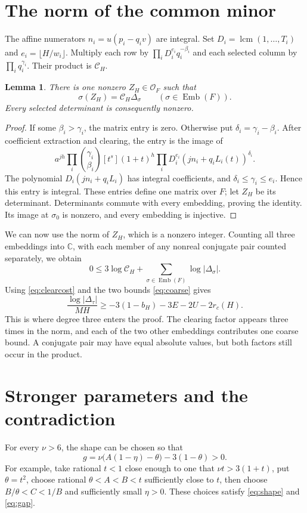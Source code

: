 \documentclass[11pt]{article}
\newcommand{\C}{\mathbb C}
\newcommand{\OO}{\mathcal O}
\newcommand{\Emb}{\operatorname{Emb}}
\newtheorem{lemma}[theorem]{Lemma}
\theoremstyle{remark}
\begin{document}
\section{The norm of the common minor}\label{sec:norm}
The affine numerators
$n_i=u(p_i-q_iv)$ are integral. Set
$D_i=\operatorname{lcm}(1,\ldots,T_i)$ and
$e_i=\lfloor H/w_i\rfloor$. Multiply each row by
$\prod_iD_i^{e_i}q_i^{-\beta_i}$ and each selected column by
$\prod_iq_i^{\gamma_i}$. Their product is $\mathscr C_H$.

\begin{lemma}\label{lem:lift}
There is one nonzero $Z_H\in\OO_F$ such that
\[
 \sigma(Z_H)=\mathscr C_H\Delta_\sigma
 \qquad(\sigma\in\Emb(F)).
\]
Every selected determinant is consequently nonzero.
\end{lemma}
\begin{proof}
If some $\beta_i>\gamma_i$, the matrix entry is zero. Otherwise put
$\delta_i=\gamma_i-\beta_i$. After coefficient extraction and clearing,
the entry is the image of
\[
 a^{jh}\prod_i\binom{\gamma_i}{\beta_i}
 [t^s](1+t)^h\prod_i D_i^{e_i}(jn_i+q_iL_i(t))^{\delta_i}.
\]
The polynomial $D_i(jn_i+q_iL_i)$ has integral coefficients, and
$\delta_i\le\gamma_i\le e_i$. Hence this entry is integral. These
entries define one matrix over $F$; let $Z_H$ be its determinant.
Determinants commute with every embedding, proving the identity.
Its image at $\sigma_0$ is nonzero, and every embedding is injective.
\end{proof}

We can now use the norm of $Z_H$, which is a nonzero integer. Counting
all three embeddings into $\C$, with each member of any nonreal
conjugate pair counted separately, we obtain
\[
 0\le3\log\mathscr C_H+\sum_{\sigma\in\Emb(F)}\log|\Delta_\sigma|.
\]
Using \eqref{eq:clearcost} and the two bounds \eqref{eq:coarse} gives
\begin{equation}\label{eq:lower}
 \frac{\log|\Delta_\tau|}{MH}
 \ge-3(1-b_H)-3E-2U-2r_c(H).
\end{equation}
This is where degree three enters the proof. The clearing factor
appears three times in the norm, and each of the two other embeddings
contributes one coarse bound. A conjugate pair may have equal absolute
values, but both factors still occur in the product.

\section{Stronger parameters and the contradiction}\label{sec:parameters}
For every $\nu>6$, the shape can be chosen so that
\begin{equation}\label{eq:gap}
 g=\nu\bigl(A(1-\eta)-\theta\bigr)-3(1-\theta)>0.
\end{equation}
For example, take rational $t<1$ close enough to one that
$\nu t>3(1+t)$, put $\theta=t^2$, choose rational
$\theta<A<B<t$ sufficiently close to $t$, then choose
$B/\theta<C<1/B$ and sufficiently small $\eta>0$.
These choices satisfy \eqref{eq:shape} and \eqref{eq:gap}.
\end{document}
